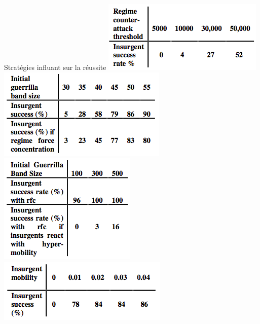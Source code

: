 \documentclass{article}
\begin{document}
Stratégies influant sur la réussite
\includegraphics[scale=0.5]{../ressources/iruba_counter_attack}
\includegraphics[scale=0.5]{../ressources/iruba_force_concentration}
\includegraphics[scale=0.5]{../ressources/iruba_hyper_mobility}
\includegraphics[scale=0.5]{../ressources/iruba_mobility}
\end{document}
